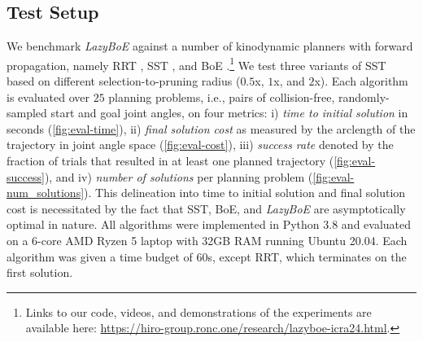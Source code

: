 \subsection{Test Setup}

We benchmark \textsl{LazyBoE} against a number of kinodynamic planners with forward propagation, namely RRT \cite{lavalle2001randomized}, SST \cite{li2016asymptotically}, and BoE \cite{shome2021asymptotically}.\footnote{Links to our code, videos, and demonstrations of the experiments are available here: \href{https://hiro-group.ronc.one/research/lazyboe-icra24.html}{https://hiro-group.ronc.one/research/lazyboe-icra24.html}.} We test three variants of SST based on different selection-to-pruning radius ($0.5$x, $1$x, and $2$x).
Each algorithm is evaluated over $25$ planning problems, i.e., pairs of collision-free, randomly-sampled start and goal joint angles, on four metrics: i) \textsl{time to initial solution} in seconds (\cref{fig:eval-time}), ii) \textsl{final solution cost} as measured by the arclength of the trajectory in joint angle space (\cref{fig:eval-cost}), iii) \textsl{success rate} denoted by the fraction of trials that resulted in at least one planned trajectory (\cref{fig:eval-success}), and iv) \textsl{number of solutions} per planning problem (\cref{fig:eval-num_solutions}). 
This delineation into time to initial solution and final solution cost is necessitated by the fact that SST, BoE, and \textsl{LazyBoE} are asymptotically optimal in nature. All algorithms were implemented in Python 3.8 and evaluated on a 6-core AMD Ryzen 5 laptop with 32GB RAM running Ubuntu 20.04. Each algorithm was given a time budget of $60$s, except RRT, which terminates on the first solution.

